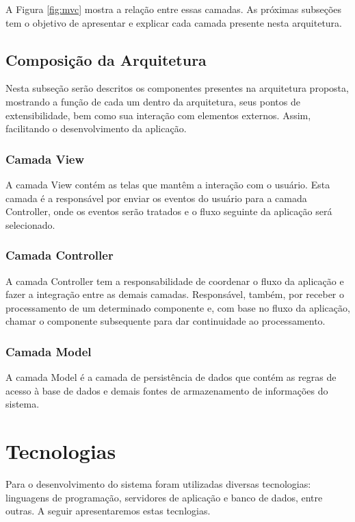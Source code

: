 A Figura \ref{fig:mvc} mostra a relação entre essas camadas. As próximas subseções tem o objetivo de apresentar e explicar cada camada presente nesta arquitetura.

\subsection{Composição da Arquitetura}

Nesta subseção serão descritos os componentes presentes na arquitetura proposta, mostrando a função de cada um dentro da arquitetura, seus pontos de extensibilidade, bem como sua interação com elementos externos. Assim, facilitando o desenvolvimento da aplicação.

\subsubsection{Camada View}
A camada View contém as telas que mantêm a interação com o usuário. Esta camada é a responsável por enviar os eventos do usuário para a camada Controller, onde os eventos serão tratados e o fluxo seguinte da aplicação será selecionado.

\subsubsection{Camada Controller}

A camada Controller tem a responsabilidade de coordenar o fluxo da aplicação e fazer a integração entre as demais camadas. Responsável, também, por receber o processamento de um determinado componente e, com base no fluxo da aplicação, chamar o componente subsequente para dar continuidade ao processamento.

\subsubsection{Camada Model}
A camada Model é a camada de persistência de dados que contém as regras de acesso à base de dados e demais fontes de armazenamento de informações do sistema.





\section{Tecnologias}

Para o desenvolvimento do sistema foram utilizadas diversas tecnologias: linguagens de programação, servidores de aplicação e banco de dados, entre outras. A seguir apresentaremos estas tecnlogias.

